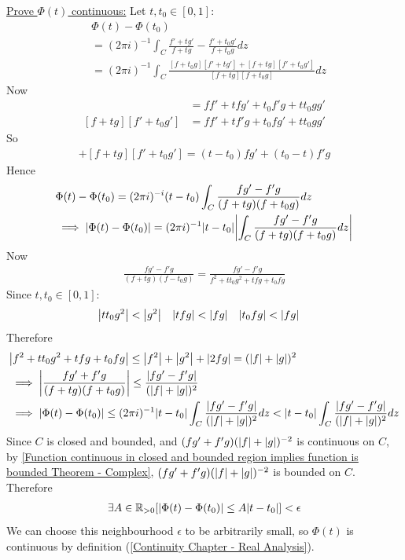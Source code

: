 \documentclass[12pt, english]{book}
\makeatletter
\renewenvironment{proof}[1][\proofname]{\par
	\pushQED{\qed}%
	\normalfont \topsep6\p@\@plus6\p@\relax
	\list{}{%
		\settowidth{\leftmargin}{\itshape\proofname:\hskip\labelsep}%
		\setlength{\labelwidth}{0pt}%
		\setlength{\itemindent}{-\leftmargin}%
	}%
	\item[\hskip\labelsep\itshape#1\@addpunct{:}]\ignorespaces
	}{ \popQED\endlist\@endpefalse}
\makeatother
\begin{document}
\begin{example}
\begin{proof}
{			\underline{Prove \(\Phi(t)\) continuous:} \newline
			Let \(t, t_0 \in [0,1]\):
			\begin{align*}
				&\Phi(t) - \Phi(t_0) \\
				&= (2\pi i)^{-1} \int_{C} \frac{f' + t g'}{f + t g} - \frac{f' + t_0 g'}{f + t_0 g} dz \\
				&= (2\pi i)^{-1} \int_{C} 
					\frac{[f + t_0 g][f' + tg'] + [f + t g][f' + t_0 g']}{[f + tg][f + t_0 g]} dz
			\end{align*}
			Now
			\begin{align*}
				[f + t_0 g][f' + tg'] 
				&= ff' + tfg' + t_0 f'g + tt_0 gg' \\
				[f + t g][f' + t_0 g']
				&= ff' + tf'g + t_0 fg' + tt_0 gg'
			\end{align*}
			So
			\begin{align*}
				[f + t_0 g][f' + tg'] + [f + t g][f' + t_0 g']
				= (t-t_0) fg' + (t_0 - t) f'g
			\end{align*}
			Hence 
			\begin{align*}
				&\Phi(t) - \Phi(t_0) = (2\pi i)^{-i} (t-t_0) \int_{C} \frac{fg' - f'g}{(f + tg) (f+t_0 g)} dz \\
				&\implies \abs{\Phi(t) - \Phi(t_0)} = (2\pi i)^{-1} \abs{t-t_0} \abs{\int_{C} \frac{fg' - f'g}{(f + tg) (f+t_0 g)} dz}
			\end{align*}
			Now 
			\begin{align*}
				\frac{fg' - f'g}{(f+tg)(f-t_0 g)} = \frac{fg' - f'g}{f^2 + tt_0 g^2 + tfg + t_0 fg}
			\end{align*}
			Since \(t, t_0 \in [0,1]\):
			\begin{align*}
				\abs{tt_0 g^2} &< \abs{g^2} & \abs{tfg} &< \abs{fg} & \abs{t_0 fg} &< \abs{fg}
			\end{align*}
			Therefore
			\begin{align*}
				&\abs{f^2 + tt_0 g^2 + tfg + t_0 fg} \leq \abs{f^2} + \abs{g^2} + \abs{2fg} = (\abs{f}+\abs{g})^2 \\
				&\implies \abs{\frac{fg' + f'g}{(f+ tg)(f+t_0 g)}} \leq \frac{\abs{fg' - f'g}}{(\abs{f} + \abs{g})^2} \\
				&\implies \abs{\Phi(t) - \Phi(t_0)} 
					\leq (2\pi i)^{-1} \abs{t-t_0} \int_{C} \frac{\abs{fg' - f'g}}{(\abs{f} + \abs{g})^2} dz 
					< \abs{t-t_0} \int_{C} \frac{\abs{fg' - f'g}}{(\abs{f} + \abs{g})^2} dz 
			\end{align*}
			Since \(C\) is closed and bounded, and \((fg' + f'g)(\abs{f}+\abs{g})^{-2}\) is continuous on \(C\), by \cref{Function continuous in closed and bounded region implies function is bounded Theorem - Complex}, \((fg' + f'g)(\abs{f}+\abs{g})^{-2}\) is bounded on \(C\). Therefore
			\begin{align*}
				\exists A \in \mathbb{R}_{>0} [\abs{\Phi(t) - \Phi(t_0)} \leq A\abs{t-t_0}] < \epsilon
			\end{align*}
			We can choose this neighbourhood \(\epsilon\) to be arbitrarily small, so \(\Phi(t)\) is continuous by definition (\cref{Continuity Chapter - Real Analysis}).
			
}
\end{proof}
\end{example}
\end{document}
